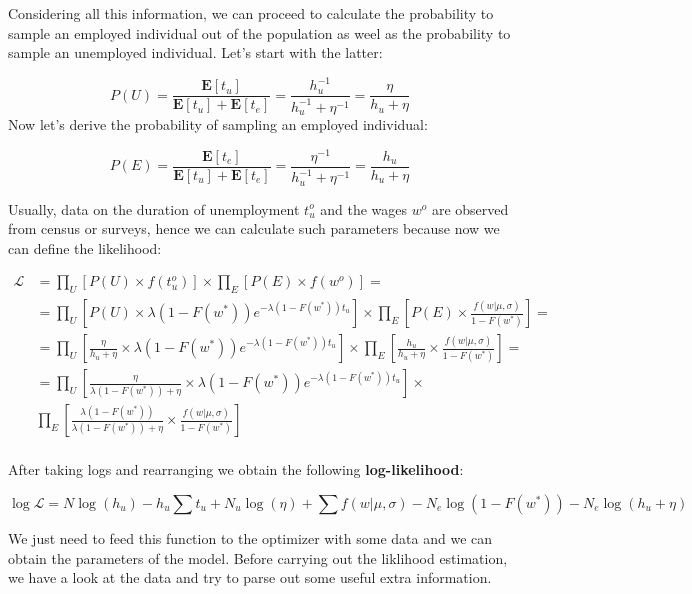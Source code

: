 \documentclass[]{book}
\begin{document}
Considering all this information, we can proceed to calculate the
probability to sample an employed individual out of the population as
weel as the probability to sample an unemployed individual. Let's start
with the latter:

\[P(U)=\frac{\mathbf{E}[t_u]}{\mathbf{E}[t_u]+\mathbf{E}[t_e]}=\frac{h_u^{-1}}{h_u^{-1}+\eta^{-1}}=\frac{\eta}{h_u+\eta}\]
Now let's derive the probability of sampling an employed individual:

\[P(E)=\frac{\mathbf{E}[t_e]}{\mathbf{E}[t_u]+\mathbf{E}[t_e]}=\frac{\eta^{-1}}{h_u^{-1}+\eta^{-1}}=\frac{h_u}{h_u+\eta}\]

Usually, data on the duration of unemployment \(t_u^o\) and the wages
\(w^o\) are observed from census or surveys, hence we can calculate such
parameters because now we can define the likelihood:

\begin{equation}
\begin{aligned}
\mathcal{L}&=\prod_U [P(U) \times f(t_u^o)]\times \prod_E [P(E) \times f(w^o)]=\\
&= \prod_U\left[ P(U) \times \lambda (1- F(w^*)) e^{- \lambda (1- F(w^*)) t_u} \right] \times \prod_E \left[P(E) \times \frac{f(w|\mu, \sigma)}{1 - F(w^*)} \right]=\\
&=  \prod_U\left[\frac{\eta}{h_u+\eta}  \times \lambda (1- F(w^*)) e^{- \lambda (1- F(w^*)) t_u} \right] \times \prod_E \left[\frac{h_u}{h_u+\eta} \times \frac{f(w|\mu, \sigma)}{1 - F(w^*)} \right]=\\
&=  \prod_U\left[\frac{\eta}{\lambda (1- F(w^*))+\eta}  \times \lambda (1- F(w^*)) e^{- \lambda (1- F(w^*)) t_u} \right] \times\\
&\prod_E \left[\frac{\lambda (1- F(w^*))}{\lambda (1- F(w^*))+\eta} \times \frac{f(w|\mu, \sigma)}{1 - F(w^*)} \right]\\
\end{aligned}
\end{equation}

After taking logs and rearranging we obtain the following
\textbf{log-likelihood}:

\[\log \mathcal{L} = N \log(h_u) - h_u \sum t_u + N_u \log(\eta) + \sum f(w|\mu,\sigma) -  N_e \log(1-F(w^*))  - N_e \log(h_u + \eta)\]

We just need to feed this function to the optimizer with some data and
we can obtain the parameters of the model. Before carrying out the
liklihood estimation, we have a look at the data and try to parse out
some useful extra information.
\end{document}
